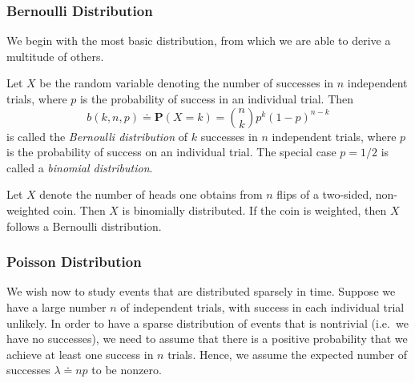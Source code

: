 \subsubsection{Bernoulli Distribution}
We begin with the most basic distribution, from which
we are able to derive a multitude of others.
\begin{definition}
	Let $X$ be the random variable denoting the number of successes
	in $n$ independent trials, where $p$ is the probability of success in
	an individual trial. Then
	\begin{equation*}
		b(k, n, p) \doteq \mathbf{P}(X = k) = \binom{n}{k} p^k {(1 - p)}^{n-k}
	\end{equation*}
	is called the \emph{Bernoulli distribution} of $k$ successes
	in $n$ independent trials, where $p$ is the probability of success on an
	individual trial. The special case
	$p = 1/2$ is called a \emph{binomial distribution}.
\end{definition}
\begin{example}
	Let $X$ denote the number of heads one obtains from $n$ flips of a
	two-sided, non-weighted coin. Then $X$ is binomially distributed.
	If the coin is weighted, then $X$ follows a Bernoulli distribution.
\end{example}
\subsubsection{Poisson Distribution}
We wish now to study events that are distributed sparsely in time.
Suppose we have a large number $n$ of independent trials, with
success in each individual trial unlikely. In order to have a sparse
distribution of events that is nontrivial (i.e.\ we have no successes),
we need to assume that there is a positive
probability that we achieve at least one success in $n$ trials. Hence, we 
assume the expected number of
successes $\lambda \doteq np$ to be nonzero.

